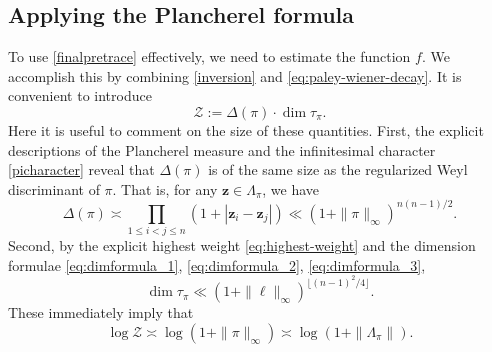 \documentclass[11pt,oneside]{amsart}
\numberwithin{equation}{section}
\theoremstyle{remark}
\theoremstyle{plain}
\newcommand{\mcZ}{\mathcal{Z}}
\newcommand{\bz}{\mathbf{z}}
\renewcommand\leq{\leqslant}
\begin{document}
\subsection{Applying the Plancherel formula}
To use \eqref{finalpretrace} effectively, we need to estimate the function $f$. We accomplish this by combining \eqref{inversion} and \eqref{eq:paley-wiener-decay}. It is convenient to introduce
\[
\mcZ:=\Delta(\pi)\cdot \dim \tau_{\pi}.
\]
Here it is useful to comment on the size of these quantities. First,
the explicit descriptions of the Plancherel measure \cite[(6.3)]{KS} and the infinitesimal character \eqref{picharacter} reveal that $\Delta(\pi)$ is of the same size as the regularized Weyl discriminant of $\pi$. That is, for any $\bz\in\Lambda_\pi$, we have
\begin{equation}\label{eq:Delta-KS}
\Delta(\pi)\asymp\prod_{1 \leq i < j \leq n}(1+ |\bz_i-\bz_j|)\ll (1+\|\pi\|_\infty)^{n(n-1)/2}.
\end{equation}
Second, by the explicit highest weight \eqref{eq:highest-weight} and the dimension formulae \eqref{eq:dimformula_1}, \eqref{eq:dimformula_2}, \eqref{eq:dimformula_3},
\begin{equation}\label{eq:dim-tau-size}
\dim\tau_{\pi}\ll(1+\|\bm\ell\|_{\infty})^{\lfloor(n-1)^2/4\rfloor}.
\end{equation}
These immediately imply that
\begin{equation}\label{eq:Z-equiv}
\log \mcZ \asymp \log (1+\|\pi\|_{\infty}) \asymp \log (1+\|\Lambda_{\pi}\|).
\end{equation}
\end{document}
